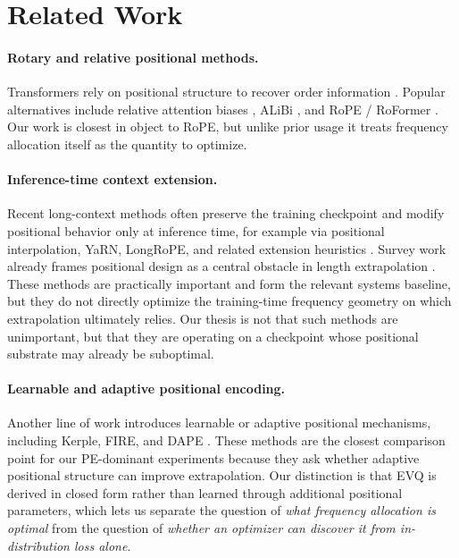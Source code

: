 \section{Related Work}

\paragraph{Rotary and relative positional methods.}
Transformers rely on positional structure to recover order information \citep{vaswani2017attention}. Popular alternatives include relative attention biases \citep{shaw2018self, raffel2020exploring}, ALiBi \citep{press2022alibi}, and RoPE / RoFormer \citep{su2024roformer}. Our work is closest in object to RoPE, but unlike prior usage it treats frequency allocation itself as the quantity to optimize.

\paragraph{Inference-time context extension.}
Recent long-context methods often preserve the training checkpoint and modify positional behavior only at inference time, for example via positional interpolation, YaRN, LongRoPE, and related extension heuristics \citep{chen2023position, peng2024yarn, ding2024longrope, anil2022pose, jin2024selfextend}. Survey work already frames positional design as a central obstacle in length extrapolation \citep{survey2024lengthextrapolation}. These methods are practically important and form the relevant systems baseline, but they do not directly optimize the training-time frequency geometry on which extrapolation ultimately relies. Our thesis is not that such methods are unimportant, but that they are operating on a checkpoint whose positional substrate may already be suboptimal.

\paragraph{Learnable and adaptive positional encoding.}
Another line of work introduces learnable or adaptive positional mechanisms, including Kerple, FIRE, and DAPE \citep{chi2023kerple, li2024fire, zheng2024dape}. These methods are the closest comparison point for our PE-dominant experiments because they ask whether adaptive positional structure can improve extrapolation. Our distinction is that EVQ is derived in closed form rather than learned through additional positional parameters, which lets us separate the question of \emph{what frequency allocation is optimal} from the question of \emph{whether an optimizer can discover it from in-distribution loss alone}.

